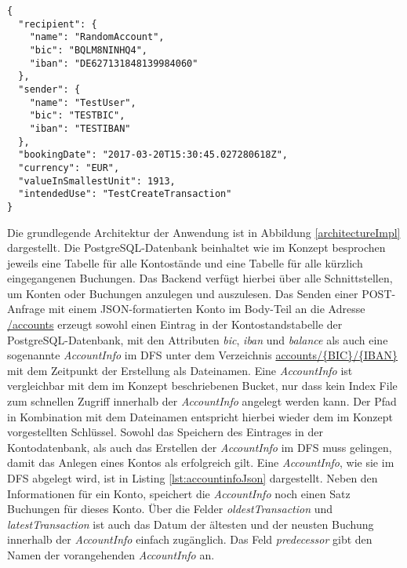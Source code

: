 \documentclass[12pt,oneside,a4paper,parskip]{scrbook}
\begin{document}
\begin{lstlisting}[label=lst:transactionJson,
           language={},
           firstnumber=1,
           caption=Buchung im JSON-Format.]           
{
  "recipient": {
    "name": "RandomAccount",
    "bic": "BQLM8NINHQ4",
    "iban": "DE627131848139984060"
  },
  "sender": {
    "name": "TestUser",
    "bic": "TESTBIC",
    "iban": "TESTIBAN"
  },
  "bookingDate": "2017-03-20T15:30:45.027280618Z",
  "currency": "EUR",
  "valueInSmallestUnit": 1913,
  "intendedUse": "TestCreateTransaction"
}
\end{lstlisting}

Die grundlegende Architektur der Anwendung ist in Abbildung \ref{architectureImpl} dargestellt. Die PostgreSQL-Datenbank beinhaltet wie im Konzept besprochen jeweils eine Tabelle für alle Kontostände und eine Tabelle für alle kürzlich eingegangenen Buchungen. Das Backend verfügt hierbei über alle Schnittstellen, um Konten oder Buchungen anzulegen und auszulesen.  Das Senden einer POST-Anfrage mit einem JSON-formatierten Konto im Body-Teil an die Adresse \url{/accounts} erzeugt sowohl einen Eintrag in der Kontostandstabelle der PostgreSQL-Datenbank, mit den Attributen \textit{bic}, \textit{iban} und \textit{balance} als auch  eine sogenannte \textit{AccountInfo} im DFS unter dem Verzeichnis \url{accounts/{BIC}/{IBAN}} mit dem Zeitpunkt der Erstellung als Dateinamen. Eine \textit{AccountInfo} ist vergleichbar mit dem im Konzept beschriebenen Bucket, nur dass kein Index File zum schnellen Zugriff innerhalb der \textit{AccountInfo} angelegt werden kann. Der Pfad in Kombination mit dem Dateinamen entspricht hierbei wieder dem im Konzept vorgestellten Schlüssel. Sowohl das Speichern des Eintrages in der Kontodatenbank, als auch das Erstellen der \textit{AccountInfo} im DFS muss gelingen, damit das Anlegen eines Kontos als erfolgreich gilt. Eine \textit{AccountInfo}, wie sie im DFS abgelegt wird, ist in Listing \ref{lst:accountinfoJson} dargestellt. Neben den Informationen für ein Konto, speichert die \textit{AccountInfo} noch einen Satz Buchungen für dieses Konto. Über die Felder \textit{oldestTransaction} und \textit{latestTransaction} ist auch das Datum der ältesten und der neusten Buchung innerhalb der \textit{AccountInfo} einfach zugänglich. Das Feld \textit{predecessor} gibt den Namen der vorangehenden \textit{AccountInfo} an.
\end{document}
